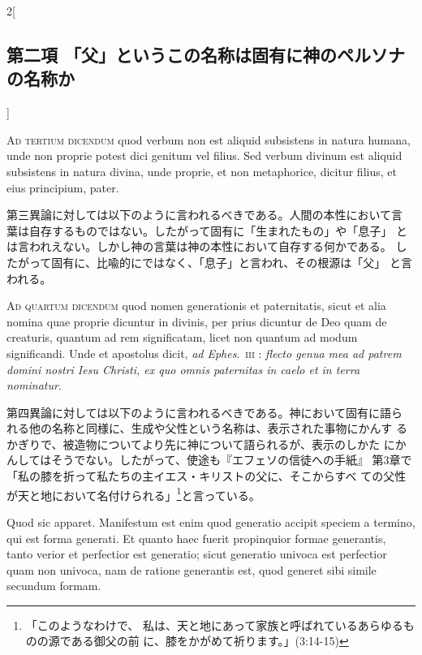 \documentclass[paper=a4paper,fontsize=10pt,jafontsize=9pt,titlepage]{jlreq}
\begin{document}
\begin{paracol}{2}[\subsection{第二項 「父」というこの名称は固有に神のペルソナの名称か}]
\switchcolumn*[\subsection{ad.3}]


{\scshape Ad tertium dicendum} quod verbum non est aliquid subsistens in natura
humana, unde non proprie potest dici genitum vel filius. Sed verbum
divinum est aliquid subsistens in natura divina, unde proprie, et non
metaphorice, dicitur filius, et eius principium, pater.


\switchcolumn


第三異論に対しては以下のように言われるべきである。人間の本性において言
 葉は自存するものではない。したがって固有に「生まれたもの」や「息子」
 とは言われえない。しかし神の言葉は神の本性において自存する何かである。
 したがって固有に、比喩的にではなく、「息子」と言われ、その根源は「父」
 と言われる。


\switchcolumn*[\subsection{ad.4}]


{\scshape Ad quartum dicendum} quod nomen generationis et paternitatis, sicut et
alia nomina quae proprie dicuntur in divinis, per prius dicuntur de
Deo quam de creaturis, quantum ad rem significatam, licet non quantum
ad modum significandi. Unde et apostolus dicit, {\itshape ad
 Ephes}.~{\scshape iii} : {\itshape flecto
genua mea ad patrem domini nostri Iesu Christi, ex quo omnis
paternitas in caelo et in terra nominatur}.


\switchcolumn


第四異論に対しては以下のように言われるべきである。神において固有に語ら
 れる他の名称と同様に、生成や父性という名称は、表示された事物にかんす
 るかぎりで、被造物についてより先に神について語られるが、表示のしかた
 にかんしてはそうでない。したがって、使途も『エフェソの信徒への手紙』
 第3章で「私の膝を折って私たちの主イエス・キリストの父に、そこからすべ
 ての父性が天と地において名付けられる」\footnote{「このようなわけで、
 私は、天と地にあって家族と呼ばれているあらゆるものの源である御父の前
 に、膝をかがめて祈ります。」(3:14-15)}と言っている。


\switchcolumn*


Quod sic
apparet. Manifestum est enim quod generatio accipit speciem a termino,
qui est forma generati. Et quanto haec fuerit propinquior formae
generantis, tanto verior et perfectior est generatio; sicut generatio
univoca est perfectior quam non univoca, nam de ratione generantis
est, quod generet sibi simile secundum formam.



\end{paracol}
\end{document}
